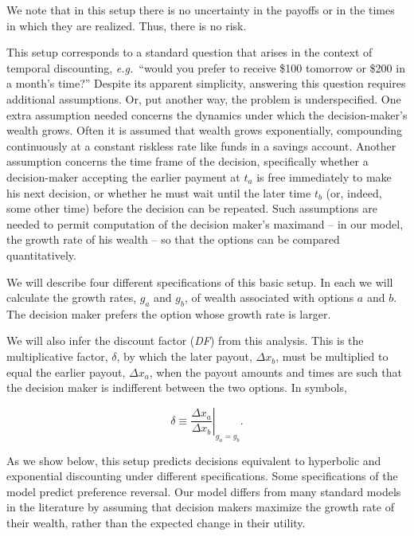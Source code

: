 \documentclass[11pt]{article}
\newcommand{\Sref}[1]{Section~\ref{sec:#1}}
\newcommand{\eg}{{\it e.g.}\ }
\newcommand{\be}{\begin{equation}}
\newcommand{\ee}{\end{equation}}
\newcommand{\Dx}{\Delta x}
\numberwithin{equation}{section}
\begin{document}
We note that in this setup there is no uncertainty in the payoffs or in the times in which they are realized. Thus, there is no risk.

This setup corresponds to a standard question that arises in the context of temporal discounting, \eg ``would you prefer to receive \$100 tomorrow or \$200 in a month's time?'' Despite its apparent simplicity, answering this question requires additional assumptions. Or, put another way, the problem is underspecified. One extra assumption needed concerns the dynamics under which the decision-maker's wealth grows. Often it is assumed that wealth grows exponentially, compounding continuously at a constant riskless rate like funds in a savings account. Another assumption concerns the time frame of the decision, specifically whether a decision-maker accepting the earlier payment at $t_a$ is free immediately to make his next decision, or whether he must wait until the later time $t_b$ (or, indeed, some other time) before the decision can be repeated. Such assumptions are needed to permit computation of the decision maker's maximand -- in our model, the growth rate of his wealth -- so that the options can be compared quantitatively.

We will describe four different specifications of this basic setup. In each we will calculate the growth rates, $g_a$ and $g_b$, of wealth associated with options $a$ and $b$. The decision maker prefers the option whose growth rate is larger.

We will also infer the discount factor (\textit{DF}) from this analysis. This is the multiplicative factor, $\delta$, by which the later payout, $\Dx_b$, must be multiplied to equal the earlier payout, $\Dx_a$, when the payout amounts and times are such that the decision maker is indifferent between the two options. In symbols,

\be
\delta \equiv \left.\frac{\Dx_a}{\Dx_b}\right|_{g_a=g_b}.
\ee

As we show below, this setup predicts decisions equivalent to hyperbolic and exponential discounting under different specifications. Some specifications of the model predict preference reversal. Our model differs from many standard models in the literature by assuming that decision makers maximize the growth rate of their wealth, rather than the expected change in their utility.
\end{document}
